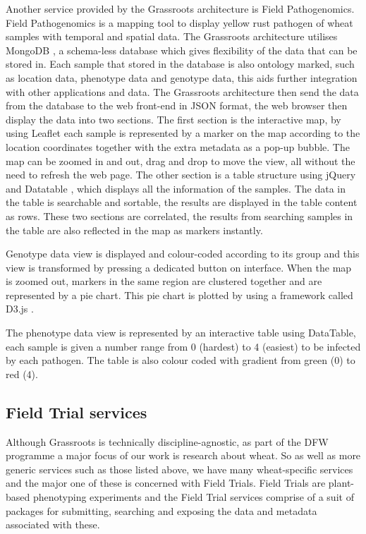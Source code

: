 \documentclass[9pt,a4paper]{extarticle}
\begin{document}
Another service provided by the Grassroots architecture is Field Pathogenomics. 
Field Pathogenomics is a mapping tool to display yellow rust pathogen of wheat samples with temporal and spatial data. 
The Grassroots architecture utilises MongoDB \cite{mongodb}, a schema-less database which gives flexibility of the data that can be stored in. 
Each sample that stored in the database is also ontology marked, such as location data, phenotype data and genotype data, this aids further integration with other applications and data. 
The Grassroots architecture then send the data from the database to the web front-end in JSON format, the web browser then display the data into two sections. 
The first section is the interactive map, by using Leaflet \cite{leaflet} each sample is represented by a marker on the map according to the location coordinates together with the extra metadata as a pop-up bubble.
The map can be zoomed in and out, drag and drop to move the view, all without the need to refresh the web page.
The other section is a table structure using jQuery \cite{jquery} and Datatable \cite{datatable}, which displays all the information of the samples.
The data in the table is searchable and sortable, the results are displayed in the table content as rows. 
These two sections are correlated, the results from searching samples in the table are also reflected in the map as markers instantly.

Genotype data view is displayed and colour-coded according to its group and this view is transformed by pressing a dedicated button on interface. 
When the map is zoomed out, markers in the same region are clustered together and are represented by a pie chart. 
This pie chart is plotted by using a framework called D3.js \cite{d3js}.

The phenotype data view is represented by an interactive table using DataTable, each sample is given a number range from 0 (hardest) to 4 (easiest) to be infected by each pathogen. The table is also colour coded with gradient from green (0) to red (4).

\subsection*{Field Trial services}

Although Grassroots is technically discipline-agnostic, as part of the DFW programme a major focus of our work is research about wheat. 
So as well as more generic services such as those listed above, we have many wheat-specific services and the major one of these is concerned with Field Trials.
Field Trials are plant-based phenotyping experiments and the Field Trial services comprise of a suit of packages for submitting, searching and exposing the data and metadata associated with these. 
\end{document}
